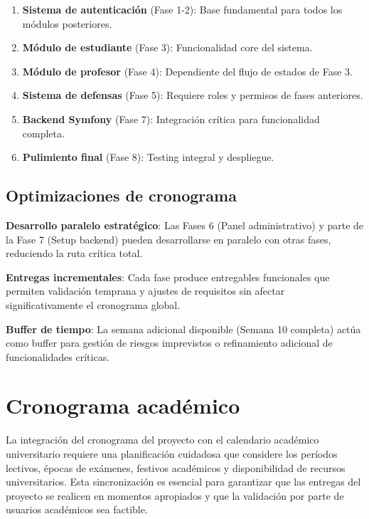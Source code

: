 \documentclass[12pt,a4paper,oneside]{report}
\providecommand{\tightlist}{%
  \setlength{\itemsep}{0pt}\setlength{\parskip}{0pt}}
\begin{document}
\begin{enumerate}
\def\labelenumi{\arabic{enumi}.}
\tightlist
\item
  \textbf{Sistema de autenticación} (Fase 1-2): Base fundamental para
  todos los módulos posteriores.
\item
  \textbf{Módulo de estudiante} (Fase 3): Funcionalidad core del
  sistema.
\item
  \textbf{Módulo de profesor} (Fase 4): Dependiente del flujo de estados
  de Fase 3.
\item
  \textbf{Sistema de defensas} (Fase 5): Requiere roles y permisos de
  fases anteriores.
\item
  \textbf{Backend Symfony} (Fase 7): Integración crítica para
  funcionalidad completa.
\item
  \textbf{Pulimiento final} (Fase 8): Testing integral y despliegue.
\end{enumerate}

\subsection{Optimizaciones de
cronograma}\label{optimizaciones-de-cronograma}

\textbf{Desarrollo paralelo estratégico}: Las Fases 6 (Panel
administrativo) y parte de la Fase 7 (Setup backend) pueden
desarrollarse en paralelo con otras fases, reduciendo la ruta crítica
total.

\textbf{Entregas incrementales}: Cada fase produce entregables
funcionales que permiten validación temprana y ajustes de requisitos sin
afectar significativamente el cronograma global.

\textbf{Buffer de tiempo}: La semana adicional disponible (Semana 10
completa) actúa como buffer para gestión de riesgos imprevistos o
refinamiento adicional de funcionalidades críticas.

\section{Cronograma académico}\label{cronograma-acaduxe9mico}

La integración del cronograma del proyecto con el calendario académico
universitario requiere una planificación cuidadosa que considere los
períodos lectivos, épocas de exámenes, festivos académicos y
disponibilidad de recursos universitarios. Esta sincronización es
esencial para garantizar que las entregas del proyecto se realicen en
momentos apropiados y que la validación por parte de usuarios académicos
sea factible.
\end{document}
